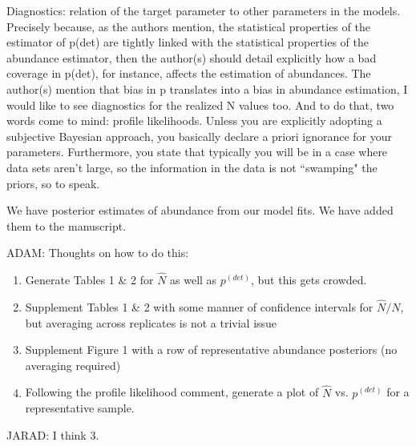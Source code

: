 \documentclass[12pt]{article}
\renewenvironment{quote}  %
              {\list{}{\rightmargin\leftmargin}\normalfont%
               \item\relax}
              {\endlist}
\newcommand{\adam}[1]{{\color{blue} ADAM: #1}}
\newcommand{\jarad}[1]{{\color{Orange} JARAD: #1}}
\newcommand{\pdet}{p^{(det)}}
\begin{document}
Diagnostics: relation of the target parameter to other parameters in the models. Precisely because, as the authors mention, the statistical properties of the estimator of p(det) are tightly linked with the statistical properties of the abundance estimator, then the author(s) should detail explicitly how a bad coverage in p(det), for instance, affects the estimation of abundances. The author(s) mention that bias in p translates into a bias in abundance estimation, I would like to see diagnostics for the realized N values too. And to do that, two words come to mind: profile likelihoods. Unless you are explicitly adopting a subjective Bayesian approach, you basically declare a priori ignorance for your parameters.  Furthermore, you state that typically you will be in a case where data sets aren't large, so the information in the data is not ``swamping" the priors, so to speak.
\begin{quote}
We have posterior estimates of abundance from our model fits.  We have added them to the manuscript.\\
\adam{Thoughts on how to do this:
\begin{enumerate}
\item Generate Tables 1 \& 2 for $\hat{N}$ as well as $\pdet$, but this gets crowded.
\item Supplement Tables 1 \& 2 with some manner of confidence intervals for $\hat{N} / N$, but averaging across replicates is not a trivial issue
\item Supplement Figure 1 with a row of representative abundance posteriors (no averaging required)
\item Following the profile likelihood comment, generate a plot of $\hat{N}$ vs. $\pdet$ for a representative sample.
\end{enumerate}
}
\jarad{I think 3.}
\end{quote}
\end{document}
